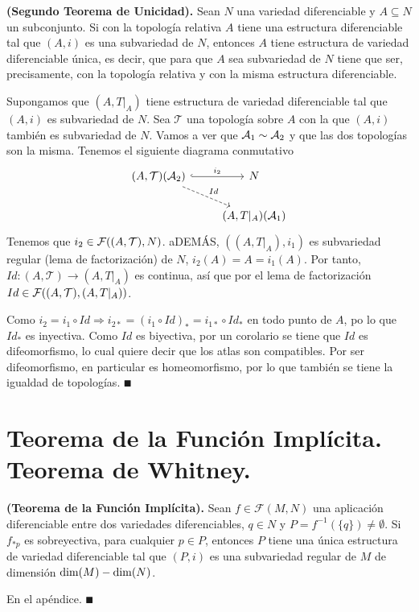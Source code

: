 \documentclass[Cursovd_portada.tex]{subfiles}
\begin{document}
\begin{teorema}
{\bf (Segundo Teorema de Unicidad).} Sean $N$ una variedad
diferenciable y $A\subseteq N$ un subconjunto. Si con la
topología relativa $A$ tiene una estructura diferenciable tal
que $(A,i)$ es una subvariedad de $N$, entonces $A$ tiene
estructura de variedad diferenciable única, es decir, que para
que $A$ sea subvariedad de $N$ tiene que ser, precisamente, con la
topología relativa y con la misma estructura diferenciable.
\end{teorema}
\begin{dem}
Supongamos que $(A,T|_A)$ tiene estructura de variedad diferenciable tal que $(A,i)$ es subvariedad de $N$. Sea $\mathcal{T}$ una topología sobre $A$ con la que $(A,i)$ también es subvariedad de $N$.  Vamos a ver que $\mathcal{A}_1\sim\mathcal{A}_2$ y que las dos topologías son la misma. Tenemos el siguiente diagrama conmutativo
\[
\begin{tikzcd}
(A,\mathcal{T}) (\calA_2)\arrow[r,hookrightarrow, "i_2"]\arrow[dr,dashrightarrow, "Id"] & N\\
& (A,T|_A) (\calA_1)
\end{tikzcd}
\]
Tenemos que $i_2\in\mathcal{F}((A,\mathcal{T}), N)$. aDEMÁS, $((A,T|_A),i_1)$ es subvariedad regular (lema de factorización) de $N$, $i_2(A)=A=i_1(A)$. Por tanto, $Id:(A,\mathcal{T})\to(A,T|_A)$ es continua, así que por el lema de factorización $Id\in\mathcal{F}((A,\mathcal{T}),(A,T|_A))$. 

Como $i_2=i_1\circ Id\Rightarrow i_{2*}=(i_1\circ Id)_*=i_{1*}\circ Id_*$ en todo punto de $A$, po lo que $Id_*$ es inyectiva. Como $Id$ es biyectiva, por un corolario se tiene que $Id$ es difeomorfismo, lo cual quiere decir que los atlas son compatibles. Por ser difeomorfismo, en particular es homeomorfismo, por lo que también se tiene la igualdad de topologías. $\QED$
\end{dem}
\section{Teorema de la Función Implícita. Teorema de Whitney.}
\begin{teorema}
{\bf (Teorema de la Función Implícita).} Sean
$f\in\mathcal{F}(M,N)$ una aplicación diferenciable entre dos
variedades diferenciables, $q\in N$ y
$P=f^{-1}(\{q\})\neq\emptyset$. Si $f_{*p}$ es sobreyectiva, para
cualquier $p\in P$, entonces $P$ tiene una única estructura de
variedad diferenciable tal que $(P,i)$ es una subvariedad regular
de $M$ de dimensión ${\rm dim}(M)-{\rm dim}(N)$.
\end{teorema}
\begin{dem}
En el apéndice. $\QED$
\end{dem}
\end{document}
